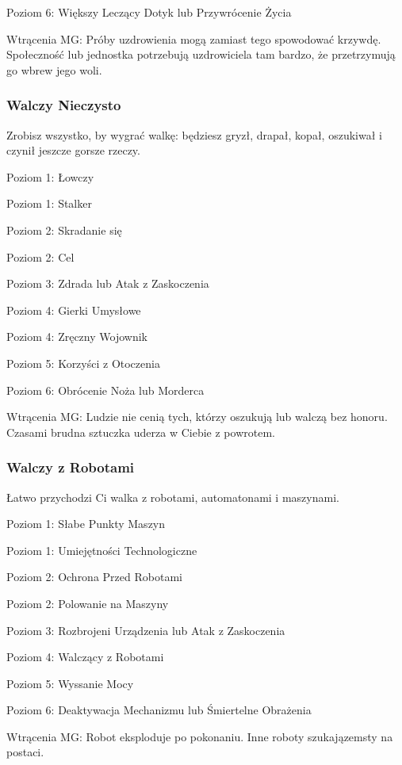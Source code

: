 Poziom 6: Większy Leczący Dotyk lub Przywrócenie Życia

Wtrącenia MG: Próby uzdrowienia mogą zamiast tego spowodować krzywdę. Społeczność lub jednostka potrzebują uzdrowiciela tam bardzo, że przetrzymują go wbrew jego woli.

\subsubsection{Walczy Nieczysto}

Zrobisz wszystko, by wygrać walkę: będziesz gryzł, drapał, kopał, oszukiwał i czynił jeszcze gorsze rzeczy.

Poziom 1: Łowczy

Poziom 1: Stalker

Poziom 2: Skradanie się

Poziom 2: Cel

Poziom 3: Zdrada lub Atak z Zaskoczenia

Poziom 4: Gierki Umysłowe

Poziom 4: Zręczny Wojownik

Poziom 5: Korzyści z Otoczenia

Poziom 6: Obrócenie Noża lub Morderca

Wtrącenia MG: Ludzie nie cenią tych, którzy oszukują lub walczą bez honoru. Czasami brudna sztuczka uderza w Ciebie z powrotem. 

\subsubsection{Walczy z Robotami}

Łatwo przychodzi Ci walka z robotami, automatonami i maszynami.

Poziom 1: Słabe Punkty Maszyn

Poziom 1: Umiejętności Technologiczne

Poziom 2: Ochrona Przed Robotami

Poziom 2: Polowanie na Maszyny

Poziom 3: Rozbrojeni Urządzenia lub Atak z Zaskoczenia

Poziom 4: Walczący z Robotami

Poziom 5: Wyssanie Mocy

Poziom 6: Deaktywacja Mechanizmu lub Śmiertelne Obrażenia

Wtrącenia MG: Robot eksploduje po pokonaniu. Inne roboty szukajązemsty na postaci. 

